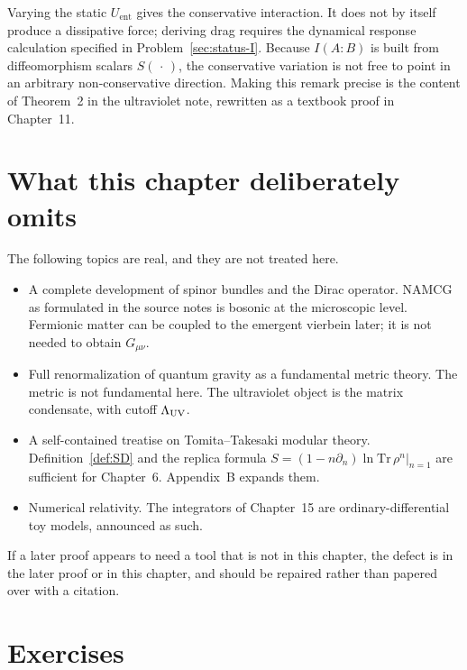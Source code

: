 Varying the static \(U_{\mathrm{ent}}\) gives the conservative
interaction. It does not by itself produce a dissipative force;
deriving drag requires the dynamical response calculation specified
in Problem~\ref{sec:status-I}. Because \(I(A:B)\) is built from
diffeomorphism scalars \(S(\,\cdot\,)\), the conservative variation
is not free to point in an arbitrary non-conservative direction.
Making this remark precise is the content of
Theorem~2 in the ultraviolet note, rewritten as a textbook proof in
Chapter~11.

\section{What this chapter deliberately omits}
\label{sec:ch2-omits}

The following topics are real, and they are not treated here.

\begin{itemize}
  \item A complete development of spinor bundles and the Dirac
        operator. NAMCG as formulated in the source notes is bosonic
        at the microscopic level. Fermionic matter can be coupled to
        the emergent vierbein later; it is not needed to obtain
        \(G_{\mu\nu}\).
  \item Full renormalization of quantum gravity as a fundamental
        metric theory. The metric is not fundamental here. The
        ultraviolet object is the matrix condensate, with cutoff
        \(\Lambda_{\mathrm{UV}}\).
  \item A self-contained treatise on Tomita--Takesaki modular theory.
        Definition~\ref{def:SD} and the replica formula
        \(S=(1-n\partial_n)\ln\mathrm{Tr}\,\rho^n|_{n=1}\)
        are sufficient for Chapter~6. Appendix~B expands them.
  \item Numerical relativity. The integrators of Chapter~15 are
        ordinary-differential toy models, announced as such.
\end{itemize}

If a later proof appears to need a tool that is not in this chapter,
the defect is in the later proof or in this chapter, and should be
repaired rather than papered over with a citation.

\section{Exercises}
\label{sec:ch2-exercises}

